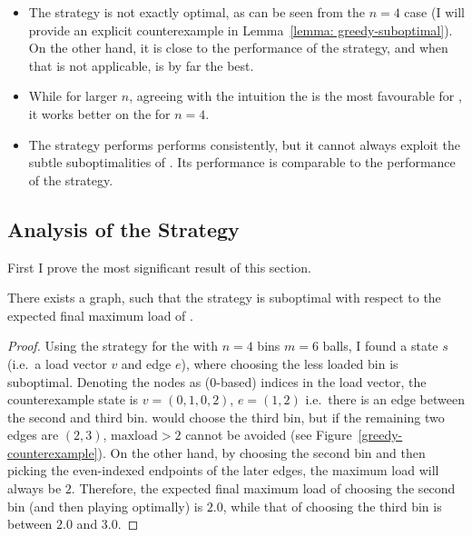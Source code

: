 \begin{itemize}
    \item The \Greedy strategy is not exactly optimal, as can be seen from the $n=4$ case (I will provide an explicit counterexample in Lemma~\ref{lemma: greedy-suboptimal}). On the other hand, it is close to the performance of the \DP strategy, and when that is not applicable, \Greedy is by far the best.
    \item While for larger $n$, agreeing with the intuition the \CompleteGraph is the most favourable for \Greedy, it works better on the \CycleGraph for $n=4$. 
    \item The \DQN strategy performs performs consistently, but it cannot always exploit the subtle suboptimalities of \Greedy. Its performance is comparable to the performance of the \LocalRewardOptimiser strategy.
    
\end{itemize}


\subsection{Analysis of the \Greedy Strategy}

First I prove the most significant result of this section.

\begin{lemma} \label{lemma: greedy-suboptimal}
There exists a graph, such that the \Greedy strategy is suboptimal with respect to the expected final maximum load of \GraphicalTwoChoice.
\end{lemma}

\begin{proof}
Using the \DP strategy for the \CycleGraph with $n=4$ bins $m=6$ balls, I found a state $s$ (i.e.\ a load vector $v$ and edge $e$), where choosing the less loaded bin is suboptimal. Denoting the nodes as ($0$-based) indices in the load vector, the counterexample state is $v=(0,1,0,2)$,  $e=(1,2)$ i.e.\ there is an edge between the second and third bin. \Greedy would choose the third bin, but if the remaining two edges are $(2,3)$, $\mathrm{maxload}>2$ cannot be avoided (see Figure~\ref{greedy-counterexample}). On the other hand, by choosing the second bin and then picking the even-indexed endpoints of the later edges, the maximum load will always be $2$. Therefore, the expected final maximum load of choosing the second bin (and then playing optimally) is $2.0$, while that of choosing the third bin is between $2.0$ and $3.0$.
\end{proof}



